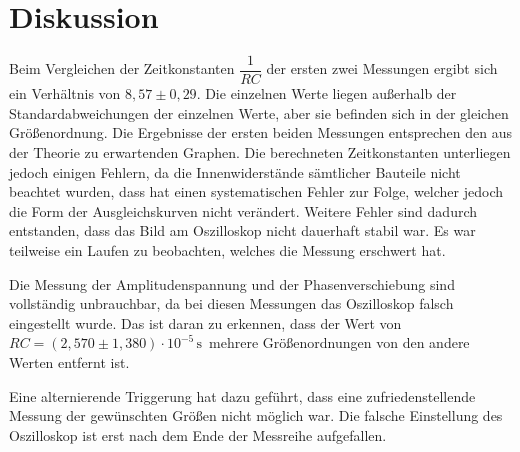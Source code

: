 \section{Diskussion}
\label{sec:Diskussion}


Beim Vergleichen der Zeitkonstanten $ \dfrac{1}{RC}$ der ersten zwei Messungen ergibt sich ein Verhältnis von  $8,57 \pm 0,29$. 
Die einzelnen Werte liegen außerhalb der Standardabweichungen der einzelnen Werte, aber sie befinden sich in der gleichen Größenordnung.
Die Ergebnisse der ersten beiden Messungen entsprechen den aus der Theorie zu erwartenden Graphen.
Die berechneten Zeitkonstanten unterliegen jedoch einigen Fehlern, da die Innenwiderstände sämtlicher Bauteile nicht beachtet wurden, dass hat einen systematischen Fehler zur Folge, welcher jedoch die Form der Ausgleichskurven nicht verändert.
Weitere Fehler sind dadurch entstanden, dass das Bild am Oszilloskop nicht dauerhaft stabil war. Es war teilweise ein Laufen zu beobachten, welches die Messung erschwert hat. 

Die Messung der Amplitudenspannung und der Phasenverschiebung sind vollständig unbrauchbar, da bei diesen Messungen das Oszilloskop falsch eingestellt wurde.
Das ist daran zu erkennen, dass der Wert von $RC = (2,570 \pm 1,380) \cdot 10^{-5} \, \unit{\second} \,$ mehrere Größenordnungen von den andere Werten entfernt ist.

Eine alternierende Triggerung hat dazu geführt, dass eine zufriedenstellende Messung der gewünschten Größen nicht möglich war.
Die falsche Einstellung des Oszilloskop ist erst nach dem Ende der Messreihe aufgefallen.
